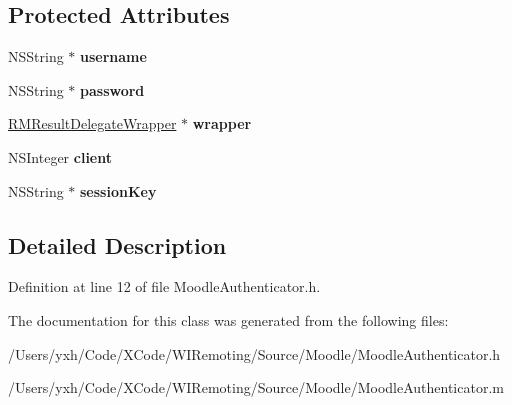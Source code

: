 \subsection*{Protected Attributes}
\begin{DoxyCompactItemize}
\item 
\hypertarget{interface_moodle_authenticator_abcad3f37150ea68b2ac261a9b1c7295c}{
NSString $\ast$ {\bfseries username}}
\label{interface_moodle_authenticator_abcad3f37150ea68b2ac261a9b1c7295c}

\item 
\hypertarget{interface_moodle_authenticator_ab1ddfb5a61697623564c492f5fd9ed67}{
NSString $\ast$ {\bfseries password}}
\label{interface_moodle_authenticator_ab1ddfb5a61697623564c492f5fd9ed67}

\item 
\hypertarget{interface_moodle_authenticator_a87890108ecada4350c3e35de19eca258}{
\hyperlink{interface_r_m_result_delegate_wrapper}{RMResultDelegateWrapper} $\ast$ {\bfseries wrapper}}
\label{interface_moodle_authenticator_a87890108ecada4350c3e35de19eca258}

\item 
\hypertarget{interface_moodle_authenticator_a7c68a63851ffa04ebf68ca971425a027}{
NSInteger {\bfseries client}}
\label{interface_moodle_authenticator_a7c68a63851ffa04ebf68ca971425a027}

\item 
\hypertarget{interface_moodle_authenticator_ae584f8cf55617b6ecb42a2e949423ca5}{
NSString $\ast$ {\bfseries sessionKey}}
\label{interface_moodle_authenticator_ae584f8cf55617b6ecb42a2e949423ca5}

\end{DoxyCompactItemize}


\subsection{Detailed Description}


Definition at line 12 of file MoodleAuthenticator.h.

The documentation for this class was generated from the following files:\begin{DoxyCompactItemize}
\item 
/Users/yxh/Code/XCode/WIRemoting/Source/Moodle/MoodleAuthenticator.h\item 
/Users/yxh/Code/XCode/WIRemoting/Source/Moodle/MoodleAuthenticator.m\end{DoxyCompactItemize}
